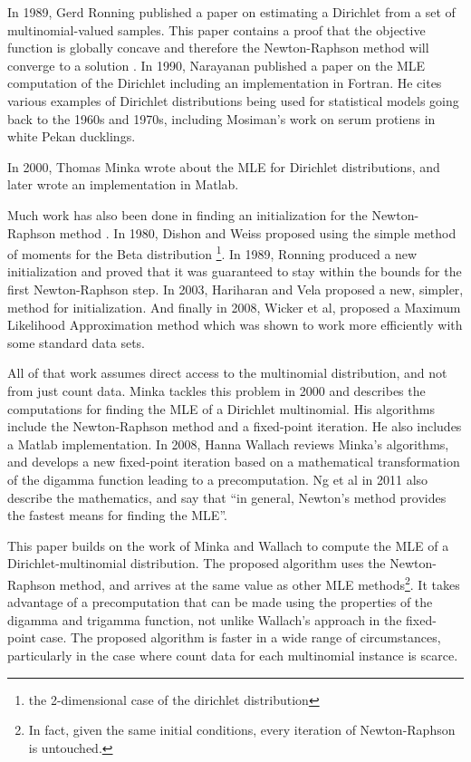 \documentclass[twoside]{article}
\begin{document}
In 1989, Gerd Ronning published a paper on estimating a Dirichlet from a set of multinomial-valued samples\cite{ronning}.  This paper contains a proof that the objective function is globally concave and therefore the Newton-Raphson method will converge to a solution \cite[pg 73]{ng}.  In 1990, Narayanan published a paper on the MLE computation of the Dirichlet including an implementation in Fortran\cite{narayanan}. He cites various examples of Dirichlet distributions being used for statistical models going back to the 1960s and 1970s, including Mosiman's work on serum protiens in white Pekan ducklings\cite[pg 8]{ng}.

In 2000, Thomas Minka\cite{minka} wrote about the MLE for Dirichlet distributions, and later wrote an implementation in Matlab.

Much work has also been done in finding an initialization for the Newton-Raphson method \cite[pg 74-54]{ng}.  In 1980, Dishon and Weiss\cite{dishon} proposed using the simple method of moments for the Beta distribution \footnote{the 2-dimensional case of the dirichlet distribution}.  In 1989, Ronning\cite{ronning} produced a new initialization and proved that it was guaranteed to stay within the bounds for the first Newton-Raphson step.  In 2003, Hariharan and Vela\cite{hariharan} proposed a new, simpler, method for initialization.  And finally in 2008, Wicker et al\cite{wicker}, proposed a Maximum Likelihood Approximation method which was shown to work more efficiently with some standard data sets.

All of that work assumes direct access to the multinomial distribution, and not from just count data.  Minka\cite{minka} tackles this problem in 2000 and describes the computations for finding the MLE of a Dirichlet multinomial.   His algorithms include the Newton-Raphson method and a fixed-point iteration.  He also includes a Matlab implementation.  In 2008, Hanna Wallach reviews Minka's algorithms, and develops a new fixed-point iteration based on a mathematical transformation of the digamma function leading to a precomputation.  Ng et al\cite{ng} in 2011 also describe the mathematics, and say that ``in general, Newton's method provides the fastest means for finding the MLE''.

This paper builds on the work of Minka and Wallach to compute the MLE of a Dirichlet-multinomial distribution.  The proposed algorithm uses the Newton-Raphson method, and arrives at the same value as other MLE methods\footnote{In fact, given the same initial conditions, every iteration of Newton-Raphson is untouched.}.  It takes advantage of a precomputation that can be made using the properties of the digamma and trigamma function, not unlike Wallach's approach in the fixed-point case.  The proposed algorithm is faster in a wide range of circumstances, particularly in the case where count data for each multinomial instance is scarce.
\end{document}
